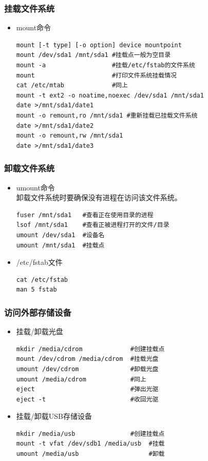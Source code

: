 \documentclass[xcolor=svgnames,presentation]{beamer}
\begin{document}
\begin{frame}[fragile]
\frametitle{挂载文件系统}
\label{sec-2-3}
\begin{itemize}

\item mount命令\\
\label{sec-2-3-1}%
\begin{verbatim}
mount [-t type] [-o option] device mountpoint
mount /dev/sda1 /mnt/sda1 #挂载点一般为空目录
mount -a                  #挂载/etc/fstab的文件系统
mount                     #打印文件系统挂载情况
cat /etc/mtab             #同上
mount -t ext2 -o noatime,noexec /dev/sda1 /mnt/sda1
date >/mnt/sda1/date1
mount -o remount,ro /mnt/sda1 #重新挂载已挂载文件系统
date >/mnt/sda1/date2
mount -o remount,rw /mnt/sda1
date >/mnt/sda1/date3
\end{verbatim}
\end{itemize} %
\end{frame}
\begin{frame}[fragile]
\frametitle{卸载文件系统}
\label{sec-2-4}
\begin{itemize}

\item umount命令\\
\label{sec-2-4-1}%
卸载文件系统时要确保没有进程在访问该文件系统。

\begin{verbatim}
fuser /mnt/sda1   #查看正在使用目录的进程
lsof /mnt/sda1    #查看正被进程打开的文件/目录
umount /dev/sda1  #设备名
umount /mnt/sda1  #挂载点
\end{verbatim}

\item /etc/fstab文件\\
\label{sec-2-4-2}%
\begin{verbatim}
cat /etc/fstab
man 5 fstab
\end{verbatim}
\end{itemize} %
\end{frame}
\begin{frame}[fragile]
\frametitle{访问外部存储设备}
\label{sec-2-5}
\begin{itemize}

\item 挂载/卸载光盘\\
\label{sec-2-5-1}%
\begin{verbatim}
mkdir /media/cdrom             #创建挂载点
mount /dev/cdrom /media/cdrom  #挂载光盘
umount /dev/cdrom              #卸载光盘
umount /media/cdrom            #同上
eject                          #弹出光驱
eject -t                       #收回光驱
\end{verbatim}

\item 挂载/卸载USB存储设备\\
\label{sec-2-5-2}%
\begin{verbatim}
mkdir /media/usb               #创建挂载点
mount -t vfat /dev/sdb1 /media/usb  #挂载
umount /media/usb                   #卸载
\end{verbatim}
\end{itemize} %
\end{frame}
\end{document}
